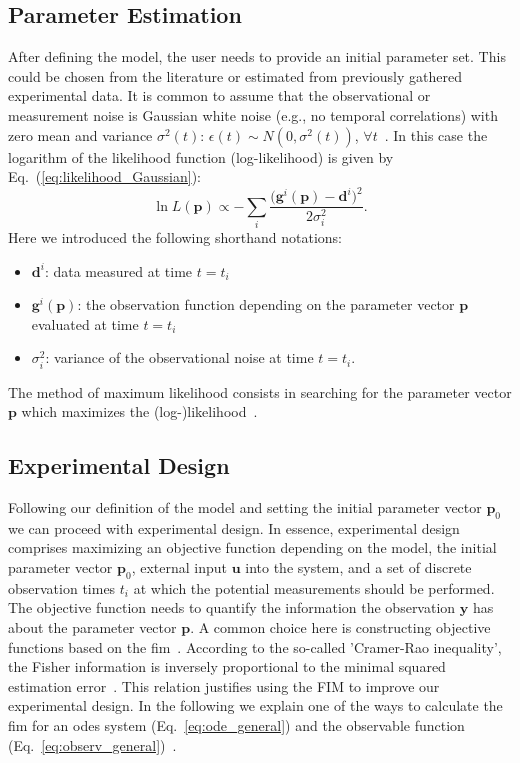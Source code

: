 \documentclass[graybox]{svmult}
\newcommand{\mbu}{\mathbf{u}}
\newcommand{\mbp}{\mathbf{p}}
\newcommand{\mby}{\mathbf{y}}
\newcommand{\mbd}{\mathbf{d}}
\begin{document}
\subsection{Parameter Estimation}
After defining the model, the user needs to provide an initial parameter set.
This could be chosen from the literature or estimated from previously gathered experimental data.
It is common to assume that the observational or measurement noise is Gaussian white noise (e.g., no temporal correlations) with zero mean and variance $\sigma^2(t)$: $\epsilon(t) \sim N(0, \sigma^2(t))$, $\forall t$~\cite{kreutzProfileLikelihood2013}.
In this case the logarithm of the likelihood function (log-likelihood) is given by Eq.~(\ref{eq:likelihood_Gaussian}):
\begin{equation}
    \ln L(\mbp) \propto - \sum_{i}\frac{ \big(\mathbf{g}^{i}(\mbp) - \mbd^{i}\big)^2}{2 \sigma_{i}^2}.
    \label{eq:likelihood_Gaussian}
\end{equation}
Here we introduced the following shorthand notations:
\begin{itemize}
\item $\mbd^{i}$: data measured at time $t=t_i$
\item $\mathbf{g}^{i}(\mbp)$: the observation function depending on the parameter vector $\mbp$ evaluated at time $t=t_i$
\item $\sigma_{i}^2$: variance of the observational noise at time $t=t_i$.
\end{itemize}
The method of maximum likelihood consists in searching for the parameter vector $\mbp$ which maximizes the (log-)likelihood~\cite{gaborRobustEfficient2015}.
%
%
\subsection{Experimental Design}
Following our definition of the model and setting the initial parameter vector $\mbp_0$ we can proceed with experimental design.
In essence, experimental design comprises maximizing an objective function depending on the model, the initial parameter vector $\mbp_0$, external input $\mbu$ into the system, and a set of discrete observation times $t_i$ at which the potential measurements should be performed.
The objective function needs to quantify the information the observation $\mby$ has about the parameter vector $\mbp$.
A common choice here is constructing objective functions based on the \acf{fim}~\cite{lyTutorialFisher2017}.
According to the so-called 'Cramer-Rao inequality', the Fisher information is inversely proportional to the minimal squared estimation error~\cite{friedenExploratoryData2010}.
This relation justifies using the FIM to improve our experimental design.
In the following we explain one of the ways to calculate the \ac{fim} for an \acp{ode} system (Eq.~\ref{eq:ode_general}) and the observable function (Eq.~\ref{eq:observ_general})~\cite{lyTutorialFisher2017}.
%
%
\end{document}
